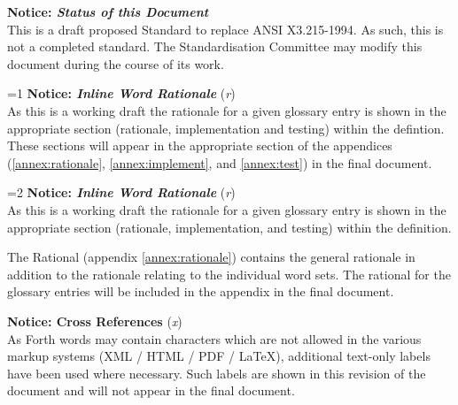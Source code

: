 \begin{titlepage}
\textbf{Notice: \emph{Status of this Document}} \\
This is a draft proposed Standard to replace ANSI X3.215-1994. As
such, this is not a completed standard. The Standardisation Committee
may modify this document during the course of its work.


%
%

\ifnum\value{part}=1
	\ifinlinebody
\textbf{Notice: \emph{Inline Word Rationale}} (\textit{r}) \\
As this is a working draft the rationale for a given glossary
entry is shown in the appropriate section (rationale,
implementation and testing) within the defintion.
These sections will appear in the appropriate section of
the appendices (\ref{annex:rationale}, \ref{annex:implement},
and \ref{annex:test}) in the final document.
	\fi
\fi


%
%

\ifnum\value{part}=2
	\ifinlinebody
\textbf{Notice: \emph{Inline Word Rationale}} (\textit{r}) \\
As this is a working draft the rationale for a given glossary
entry is shown in the appropriate section (rationale,
implementation, and testing) within the definition.

The Rational (appendix \ref{annex:rationale}) contains the
general rationale in addition to the rationale relating to
the individual word sets.
The rational for the glossary entries will be included in
the appendix in the final document.
	\fi
\fi


\ifshowref
\textbf{Notice: Cross References} (\textit{x}) \\
As Forth words may contain characters which are not allowed in the
various markup systems (XML / HTML / PDF / \LaTeX), additional
text-only labels have been used where necessary. Such labels are
shown in this revision of the document and will not appear in the
final document.
\fi
\end{titlepage}
